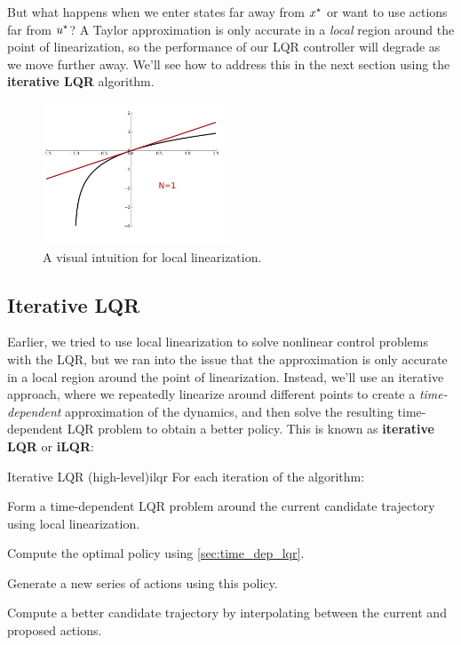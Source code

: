 \documentclass[../main/main]{subfiles}
\begin{document}
But what happens when we enter states far away from $x^\star$ or want to use actions far from $u^\star$?
A Taylor approximation is only accurate in a \emph{local} region around the point of linearization,
so the performance of our LQR controller will degrade as we move further away.
We'll see how to address this in the next section using the \textbf{iterative LQR} algorithm.
\begin{figure}[h]
    \centering
    \includegraphics[width=0.5\textwidth]{log_taylor.png}
    \caption{A visual intuition for local linearization.}
    \label{fig:local_linearization}
\end{figure}

\subsection{Iterative LQR}

Earlier, we tried to use local linearization to solve nonlinear control problems with the LQR, but we ran into the issue that the approximation is only accurate in a local region around the point of linearization.
Instead, we'll use an iterative approach, where we repeatedly linearize around different points to create a \emph{time-dependent} approximation of the dynamics, and then solve the resulting time-dependent LQR problem to obtain a better policy.
This is known as \textbf{iterative LQR} or \textbf{iLQR}:

\begin{definition}{Iterative LQR (high-level)}{ilqr}
    For each iteration of the algorithm:
    \begin{steps}
        \item Form a time-dependent LQR problem around the current candidate trajectory using local linearization.
        \item Compute the optimal policy using \autoref{sec:time_dep_lqr}.
        \item Generate a new series of actions using this policy.
        \item Compute a better candidate trajectory by interpolating between the current and proposed actions.
    \end{steps}
\end{definition}
\end{document}
